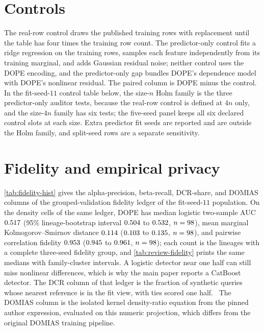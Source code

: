 \documentclass{article}
\begin{document}
\section{Controls}
\label{app:controls}
The real-row control draws the published training rows with replacement until the table has four times the training row count. The predictor-only control fits a ridge regression on the training rows, samples each feature independently from its training marginal, and adds Gaussian residual noise; neither control uses the DOPE encoding, and the predictor-only gap bundles DOPE's dependence model with DOPE's nonlinear residual. The paired column is DOPE minus the control. In the fit-seed-$11$ control table below, the size-$n$ Holm family is the three predictor-only auditor tests, because the real-row control is defined at $4n$ only, and the size-$4n$ family has six tests; the five-seed panel keeps all six declared control slots at each size. Extra predictor fit seeds are reported and are outside the Holm family, and split-seed rows are a separate sensitivity.
\begingroup
\scriptsize
\setlength{\tabcolsep}{2pt}

\endgroup

\section{Fidelity and empirical privacy}
\label{app:privacy}
\cref{tab:fidelity-hist} gives the alpha-precision, beta-recall, DCR-share, and DOMIAS columns of the grouped-validation fidelity ledger of the fit-seed-$11$ population. On the density cells of the same ledger, DOPE has median logistic two-sample AUC $0.517$ (95\% lineage-bootstrap interval $0.504$ to $0.532$, $n=98$), mean marginal Kolmogorov--Smirnov distance $0.114$ ($0.103$ to $0.135$, $n=98$), and pairwise correlation fidelity $0.953$ ($0.945$ to $0.961$, $n=98$); each count is the lineages with a complete three-seed fidelity group, and \cref{tab:review-fidelity} prints the same medians with family-cluster intervals. A logistic detector near one half can still miss nonlinear differences, which is why the main paper reports a CatBoost detector. The DCR column of that ledger is the fraction of synthetic queries whose nearest reference is in the fit view, with ties scored one half. \DcrExchange\ The DOMIAS column is the isolated kernel density-ratio equation from the pinned author expression, evaluated on this numeric projection, which differs from the original DOMIAS training pipeline.
\end{document}
